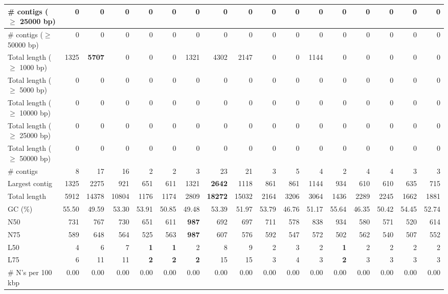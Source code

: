 \documentclass[12pt,a4paper]{article}
\begin{document}
\begin{table}[ht]
\begin{center}
\begin{tabular}{|l*{16}{|r}|}
\# contigs ($\geq$ 25000 bp) & 0 & 0 & 0 & 0 & 0 & 0 & 0 & 0 & 0 & 0 & 0 & 0 & 0 & 0 & 0 & 0 \\ \hline
\# contigs ($\geq$ 50000 bp) & 0 & 0 & 0 & 0 & 0 & 0 & 0 & 0 & 0 & 0 & 0 & 0 & 0 & 0 & 0 & 0 \\ \hline
Total length ($\geq$ 1000 bp) & 1325 & {\bf 5707} & 0 & 0 & 0 & 1321 & 4302 & 2147 & 0 & 0 & 1144 & 0 & 0 & 0 & 0 & 0 \\ \hline
Total length ($\geq$ 5000 bp) & 0 & 0 & 0 & 0 & 0 & 0 & 0 & 0 & 0 & 0 & 0 & 0 & 0 & 0 & 0 & 0 \\ \hline
Total length ($\geq$ 10000 bp) & 0 & 0 & 0 & 0 & 0 & 0 & 0 & 0 & 0 & 0 & 0 & 0 & 0 & 0 & 0 & 0 \\ \hline
Total length ($\geq$ 25000 bp) & 0 & 0 & 0 & 0 & 0 & 0 & 0 & 0 & 0 & 0 & 0 & 0 & 0 & 0 & 0 & 0 \\ \hline
Total length ($\geq$ 50000 bp) & 0 & 0 & 0 & 0 & 0 & 0 & 0 & 0 & 0 & 0 & 0 & 0 & 0 & 0 & 0 & 0 \\ \hline
\# contigs & 8 & 17 & 16 & 2 & 2 & 3 & 23 & 21 & 3 & 5 & 4 & 2 & 4 & 4 & 3 & 3 \\ \hline
Largest contig & 1325 & 2275 & 921 & 651 & 611 & 1321 & {\bf 2642} & 1118 & 861 & 861 & 1144 & 934 & 610 & 610 & 635 & 715 \\ \hline
Total length & 5912 & 14378 & 10804 & 1176 & 1174 & 2809 & {\bf 18272} & 15032 & 2164 & 3206 & 3064 & 1436 & 2289 & 2245 & 1662 & 1881 \\ \hline
GC (\%) & 55.50 & 49.59 & 53.30 & 53.91 & 50.85 & 49.48 & 53.39 & 51.97 & 53.79 & 46.76 & 51.17 & 55.64 & 46.35 & 50.42 & 54.45 & 52.74 \\ \hline
N50 & 731 & 767 & 730 & 651 & 611 & {\bf 987} & 692 & 697 & 711 & 578 & 838 & 934 & 580 & 571 & 520 & 614 \\ \hline
N75 & 589 & 648 & 564 & 525 & 563 & {\bf 987} & 607 & 576 & 592 & 547 & 572 & 502 & 562 & 540 & 507 & 552 \\ \hline
L50 & 4 & 6 & 7 & {\bf 1} & {\bf 1} & 2 & 8 & 9 & 2 & 3 & 2 & {\bf 1} & 2 & 2 & 2 & 2 \\ \hline
L75 & 6 & 11 & 11 & {\bf 2} & {\bf 2} & {\bf 2} & 15 & 15 & 3 & 4 & 3 & {\bf 2} & 3 & 3 & 3 & 3 \\ \hline
\# N's per 100 kbp & 0.00 & 0.00 & 0.00 & 0.00 & 0.00 & 0.00 & 0.00 & 0.00 & 0.00 & 0.00 & 0.00 & 0.00 & 0.00 & 0.00 & 0.00 & 0.00 \\ \hline
\end{tabular}
\end{center}
\end{table}
\end{document}
